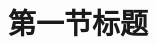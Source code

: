 \documentclass[../../main.tex]{subfiles}
\begin{document}
\section{第一节标题}

\lipsum[1-3]%
\end{document}
